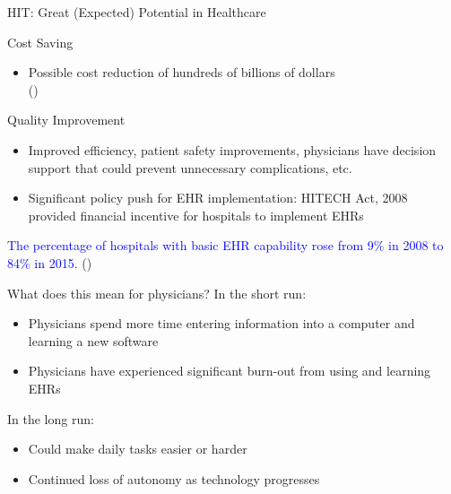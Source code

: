 \documentclass[10pt]{beamer}
\begin{document}
\begin{frame}[fragile]{HIT: Great (Expected) Potential in Healthcare}
\begin{alertblock}{Cost Saving}
\begin{itemize}
    \item Possible cost reduction of hundreds of billions of dollars \\ (\cite{hillestad2005})
\end{itemize}
\end{alertblock}

\begin{alertblock}{Quality Improvement}
\begin{itemize}
    \item Improved efficiency, patient safety improvements, physicians have decision support that could prevent unnecessary complications, etc.
    \item Significant policy push for EHR implementation: HITECH Act, 2008 provided financial incentive for hospitals to implement EHRs \nocite{hitech}
\end{itemize}
\end{alertblock}

\textcolor{blue}{The percentage of hospitals with basic EHR capability rose from 9$\%$ in 2008 to 84$\%$ in 2015.} (\cite{stats})

\end{frame}

\begin{frame}[fragile]{What does this mean for physicians?}
In the short run:
\begin{itemize}
    \item Physicians spend more time entering information into a computer and learning a new software
    \item Physicians have experienced significant burn-out from using and learning EHRs
\end{itemize}

In the long run:
\begin{itemize}
    \item Could make daily tasks easier or harder
    \item Continued loss of autonomy as technology progresses
\end{itemize}

\end{frame}
\end{document}
